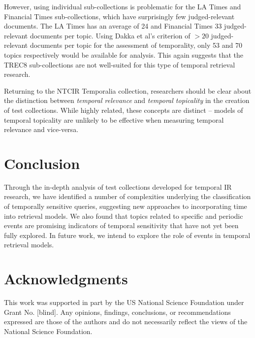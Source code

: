\documentclass{sig-alternate}
\begin{document}
However, using individual sub-collections is problematic for the LA Times and Financial Times sub-collections, which have surprisingly few judged-relevant documents. The LA Times has an average of 24 and Financial Times 33 judged-relevant documents per topic.  Using Dakka et al's criterion of $>20$ judged-relevant documents per topic for the assessment of temporality, only 53 and 70 topics respectively would be available for analysis. This again suggests that the TREC8 sub-collections are not well-suited for this type of temporal retrieval research.

Returning to the NTCIR Temporalia collection, researchers should be clear about the distinction between \emph{temporal relevance} and \emph{temporal topicality} in the creation of test collections. While highly related, these concepts are distinct -- models of temporal topicality are unlikely to be effective when measuring temporal relevance and vice-versa.

\section{Conclusion}

Through the in-depth analysis of test collections developed for temporal IR research, we have identified a number of complexities underlying the classification of temporally sensitive queries, suggesting new approaches to incorporating time into retrieval models. We also found that topics related to specific and periodic events are promising indicators of temporal sensitivity that have not yet been fully explored.  In future work, we intend to explore the role of events in temporal retrieval models. 

\section{Acknowledgments}
This work was supported in part by the US National Science Foundation under Grant No. [blind]. Any opinions, findings, conclusions, or recommendations expressed are those of the authors and do not necessarily reflect the views of the National Science Foundation. 


  
\end{document}
